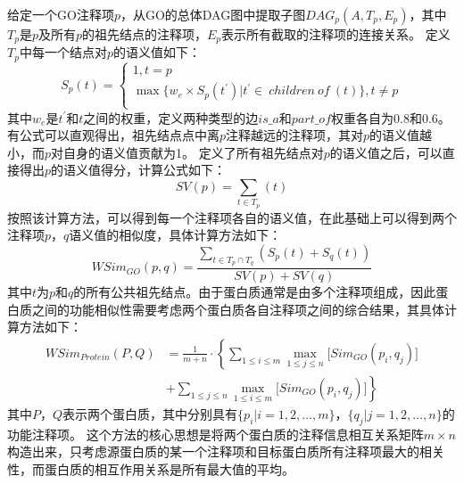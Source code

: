 给定一个GO注释项$p$，从GO的总体DAG图中提取子图$DAG_p(A,T_p,E_p)$，其中$T_p$是$p$及所有$p$的祖先结点的注释项，$E_p$表示所有截取的注释项的连接关系。
定义$T_p$中每一个结点对$p$的语义值如下：
\begin{equation}
    \label{equ:feat:go:SAT}
    S_p(t)=\left\{\begin{array}{l}
        1,t=p                                                                        \\
        \max {\{ w_e\times S_p(t^\prime )| t^\prime\in ~children~of~(t) \} },t\neq p \\
    \end{array}\right.
\end{equation}
其中$w_e$是$t^\prime$和$t$之间的权重，定义两种类型的边$is\_a$和$part\_of$权重各自为0.8和0.6。有公式可以直观得出，祖先结点点中离$p$注释越远的注释项，其对$p$的语义值越小，而$p$对自身的语义值贡献为1。
定义了所有祖先结点对$p$的语义值之后，可以直接得出$p$的语义值得分，计算公式如下：
\begin{equation}
    \label{equ:feat:go:SVA}
    SV(p)=\sum_{t \in T_p}(t)
\end{equation}
按照该计算方法，可以得到每一个注释项各自的语义值，在此基础上可以得到两个注释项$p$，$q$语义值的相似度，具体计算方法如下：
\begin{equation}
    \label{equ:feat:go:SimItemWang}
    WSim_{GO}(p,q)=\frac{\sum_{t \in T_p \cap T_q}(S_p(t)+S_q(t))}{SV(p)+SV(q)}
\end{equation}
其中$t$为$p$和$q$的所有公共祖先结点。由于蛋白质通常是由多个注释项组成，因此蛋白质之间的功能相似性需要考虑两个蛋白质各自注释项之间的综合结果，其具体计算方法如下：
\begin{equation}
    \label{equ:feat:go:SimProteinWang}
    \begin{aligned}
        WSim_{Protein}(P,Q) & =\frac{1}{m+n}\cdot \left\{\sum_{1\leq i\leq m}{\max_{1\leq j\leq n}[{Sim_{GO}(p_i,q_j)}}]\right. \\
                            & \left.+\sum_{1\leq j\leq n}{\max_{1\leq i\leq m}[{Sim_{GO}(p_i,q_j)}}]\right\}
    \end{aligned}
\end{equation}
其中$P$，$Q$表示两个蛋白质，其中分别具有$\{p_i| i=1,2,\dots,m\}$，$\{q_j| j=1,2,\dots,n\}$的功能注释项。
这个方法的核心思想是将两个蛋白质的注释信息相互关系矩阵$m\times n$构造出来，只考虑源蛋白质的某一个注释项和目标蛋白质所有注释项最大的相关性，而蛋白质的相互作用关系是所有最大值的平均。

